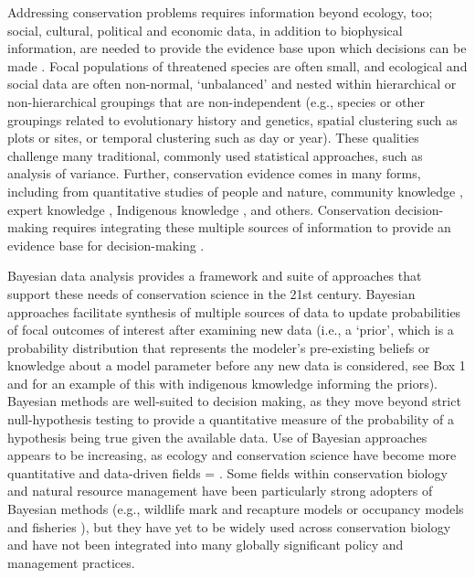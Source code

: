 \documentclass{article}
\begin{document}
\par Addressing conservation problems requires information beyond ecology, too; social, cultural, political and economic data, in addition to biophysical information, are needed to provide the evidence base upon which decisions can be made \citep{Bennett2017}. Focal populations of threatened species are often small, and ecological and social data are often non-normal, `unbalanced' and nested within hierarchical or non-hierarchical groupings that are non-independent (e.g., species or other groupings related to evolutionary history and genetics, spatial clustering such as plots or sites, or temporal clustering such as day or year). These qualities challenge many traditional, commonly used statistical approaches, such as analysis of variance. Further, conservation evidence comes in many forms, including from quantitative studies of people and nature, community knowledge \citep{Brook2008LEK}, expert knowledge \citep{Martin2012}, Indigenous knowledge \citep[e.g.,][]{gryba2023indigenous}, and others. Conservation decision-making requires integrating these multiple sources of information to provide an evidence base for decision-making \citep{stern2022interweaving}. 

\par Bayesian data analysis provides a framework and suite of approaches that support these needs of conservation science in the 21st century. 
Bayesian approaches facilitate synthesis of multiple sources of data to update probabilities of focal outcomes of interest after examining new data (i.e., a `prior', which is a probability distribution that represents the modeler's pre-existing beliefs or knowledge about a model parameter before any new data is considered, see Box 1 and \citep{gryba2026bayesian} for an example of this with indigenous kmowledge informing the priors). Bayesian methods are well-suited to decision making, as they move beyond strict null-hypothesis testing to provide a quantitative measure of the probability of a hypothesis being true given the available data. Use of Bayesian approaches appears to be increasing, as ecology and conservation science have become more quantitative and data-driven fields =  \citep{anderson2021trends}. Some fields within conservation biology and natural resource management have been particularly strong adopters of Bayesian methods (e.g., wildlife mark and recapture models or occupancy models \citep{Kery2011} and fisheries \citep{Doll2018}), but they have yet to be widely used across conservation biology and have not been integrated into many globally significant policy and management practices. 
\end{document}
